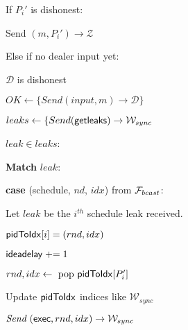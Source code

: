\begin{bbox}[title={Algorithm $\msf{SimPartyOutput}(m, P_i')$}]

	\begin{renumerate}
		\item If $P_i'$ is dishonest:
			
			\quad Send $(m, P_i') \rightarrow \mathcal{Z}$

		\item Else if no dealer input yet:

			\quad \Assert $\mathcal{D}$ is dishonest

			\quad $OK \leftarrow \{ Send (input, m) \rightarrow \mathcal{D} \}$

			\quad $leaks \leftarrow \{ Send ({\mathsf {getleaks}}) \rightarrow \mathcal{W}_{sync}$
		
			 $leak \in leaks$:
				\begin{renumerate}
					\item {\bf Match} $leak$:
						\begin{renumerate}
							\item {\bf case} (schedule, $nd$, $idx$) from $\mathcal{F}_{bcast}$:

								\quad Let $leak$ be the $i^{th}$ schedule leak received.

								\quad ${\mathsf {pidToIdx}}[i] = (rnd, idx)$

								\quad ${\mathsf {ideadelay}} \mathrel{+}= 1$
						\end{renumerate}
				\end{renumerate}
		\item $rnd,idx \leftarrow \text{ pop } {\mathsf {pidToIdx}}[P_i']$

		\item Update ${\mathsf {pidToIdx}}$ indices like $\mathcal{W}_{sync}$

		\item $\emph{Send}~ ({\mathsf {exec}}, rnd, idx) \rightarrow \mathcal{W}_{sync}$
		
	\end{renumerate}

\end{bbox}
